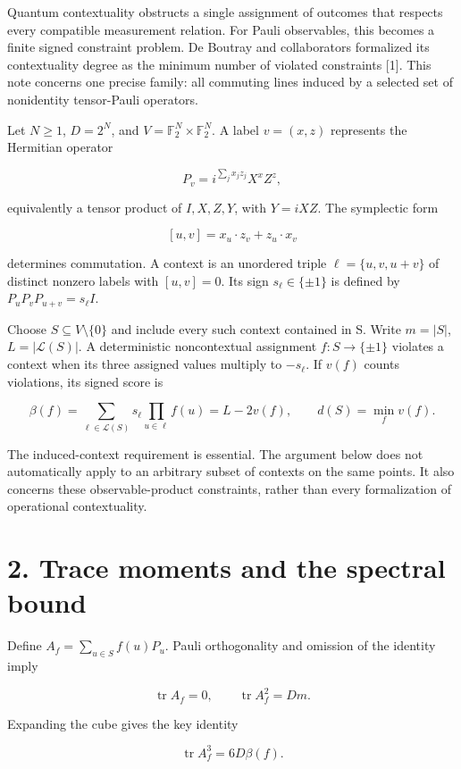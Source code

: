 \documentclass[11pt,letterpaper]{article}
\begin{document}
Quantum contextuality obstructs a single assignment of outcomes that respects every compatible measurement relation. For Pauli observables, this becomes a finite signed constraint problem. De Boutray and collaborators formalized its contextuality degree as the minimum number of violated constraints {[}1{]}. This note concerns one precise family: all commuting lines induced by a selected set of nonidentity tensor-Pauli operators.

Let \(N\ge1\), \(D=2^N\), and \(V=\mathbb F_2^N\times\mathbb F_2^N\). A label \(v=(x,z)\) represents the Hermitian operator

\[P_v=i^{\sum_jx_jz_j}X^xZ^z,\]

equivalently a tensor product of \(I,X,Z,Y\), with \(Y=iXZ\). The symplectic form

\[[u,v]=x_u\cdot z_v+z_u\cdot x_v\]

determines commutation. A context is an unordered triple \(\ell=\{u,v,u+v\}\) of distinct nonzero labels with \([u,v]=0\). Its sign \(s_\ell\in\{\pm1\}\) is defined by \(P_uP_vP_{u+v}=s_\ell I\).

Choose \(S\subseteq V\setminus\{0\}\) and include every such context contained in S. Write \(m=|S|\), \(L=|\mathcal L(S)|\). A deterministic noncontextual assignment \(f:S\to\{\pm1\}\) violates a context when its three assigned values multiply to \(-s_\ell\). If \(v(f)\) counts violations, its signed score is

\[\beta(f)=\sum_{\ell\in\mathcal L(S)}s_\ell\prod_{u\in\ell}f(u)
=L-2v(f),\qquad d(S)=\min_fv(f).\]

The induced-context requirement is essential. The argument below does not automatically apply to an arbitrary subset of contexts on the same points. It also concerns these observable-product constraints, rather than every formalization of operational contextuality.

\section{2. Trace moments and the spectral bound}\label{trace-moments-and-the-spectral-bound}

Define \(A_f=\sum_{u\in S}f(u)P_u\). Pauli orthogonality and omission of the identity imply

\[\operatorname{tr}A_f=0,\qquad \operatorname{tr}A_f^2=Dm.\]

Expanding the cube gives the key identity

\[\boxed{\operatorname{tr}A_f^3=6D\beta(f).}
\tag{1}\]
\end{document}
